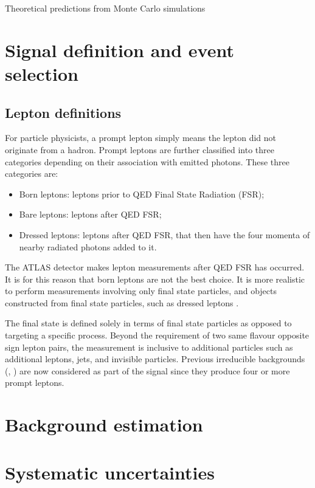 Theoretical predictions from Monte Carlo simulations

\section{Signal definition and event selection}
\label{sec:signaldef}
\subsection{Lepton definitions}

For particle physicists, a prompt lepton simply means the lepton did not originate from a hadron. Prompt leptons are further classified into three categories depending on their association with emitted photons. These three categories are:
\begin{itemize}
    \item Born leptons: leptons prior to QED Final State Radiation (FSR);
    \item Bare leptons: leptons after QED FSR;
    \item Dressed leptons: leptons after QED FSR, that then have the four momenta of nearby radiated photons added to it. 
\end{itemize}
The ATLAS detector makes lepton measurements after QED FSR has occurred. It is for this reason that born leptons are not the best choice. It is more realistic to perform measurements involving only final state particles, and objects constructed from final state particles, such as dressed leptons \cite{Kar:ab1be6}.

The final state is defined solely in terms of final state particles as opposed to targeting a specific process. Beyond the requirement of two same flavour opposite sign lepton pairs, the measurement is inclusive to additional particles such as additional leptons, jets, and invisible particles. Previous irreducible backgrounds (\VVV, \ttZ) are now considered as part of the signal since they produce four or more prompt leptons.

\section{Background estimation}
\label{sec:background}

\section{Systematic uncertainties}
\label{sec:sysuncert}

